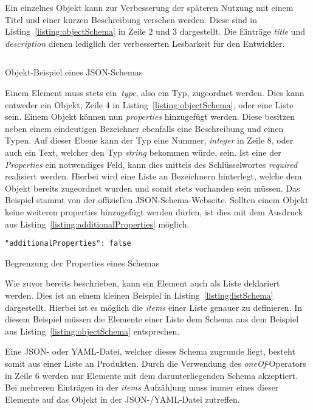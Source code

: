 Ein einzelnes Objekt kann zur Verbesserung der späteren Nutzung mit einem Titel und einer kurzen Beschreibung versehen werden.
Diese sind in Listing~\ref{listing:objectSchema} in Zeile 2 und 3 dargestellt.
Die Einträge \textit{title} und \textit{description} dienen lediglich der verbesserten Lesbarkeit für den Entwickler.

\begin{listing}[!ht]
    \inputminted{json}{listings/2.2.1/object.schema.json}
    \caption{Objekt-Beispiel eines JSON-Schemas}
    \label{listing:objectSchema}
\end{listing}

Einem Element muss stets ein~\textit{type}, also ein Typ, zugeordnet werden.
Dies kann entweder ein Objekt, Zeile 4 in Listing~\ref{listing:objectSchema}, oder eine Liste sein.
Einem Objekt können nun \textit{properties} hinzugefügt werden.
Diese besitzen neben einem eindeutigen Bezeichner ebenfalls eine Beschreibung und einen Typen.
Auf dieser Ebene kann der Typ eine Nummer, \textit{integer} in Zeile 8, oder auch ein Text, welcher den Typ \textit{string} bekommen würde, sein.
Ist eine der \textit{Properties} ein notwendiges Feld, kann dies mittels des Schlüsselwortes \textit{required} realisiert werden.
Hierbei wird eine Liste an Bezeichnern hinterlegt, welche dem Objekt bereits zugeordnet wurden und somit stets vorhanden sein müssen.
Das Beispiel stammt von der offiziellen JSON-Schema-Webseite\cite*{schemaExample}.
Sollten einem Objekt keine weiteren properties hinzugefügt werden dürfen, ist dies mit dem Ausdruck aus Listing~\ref{listing:additionalProperties} möglich.

\begin{listing}[!ht]
    \begin{verbatim}
"additionalProperties": false
    \end{verbatim}
    \caption{Begrenzung der Properties eines Schemas}
    \label{listing:additionalProperties}
\end{listing}

Wie zuvor bereits beschrieben, kann ein Element auch als Liste deklariert werden.
Dies ist an einem kleinen Beispiel in Listing~\ref{listing:listSchema} dargestellt.
Hierbei ist es möglich die \textit{items} einer Liste genauer zu definieren.
In diesem Beispiel müssen die Elemente einer Liste dem Schema aus dem Beispiel aus Listing~\ref{listing:objectSchema} entsprechen.

Eine JSON- oder YAML-Datei, welcher dieses Schema zugrunde liegt, besteht somit aus einer Liste an Produkten.
Durch die Verwendung des \textit{oneOf}-Operators in Zeile 6 werden nur Elemente mit dem darunterliegenden Schema akzeptiert.
Bei mehreren Einträgen in der \textit{items} Aufzählung muss immer eines dieser Elemente auf das Objekt in der JSON-/YAML-Datei zutreffen.

